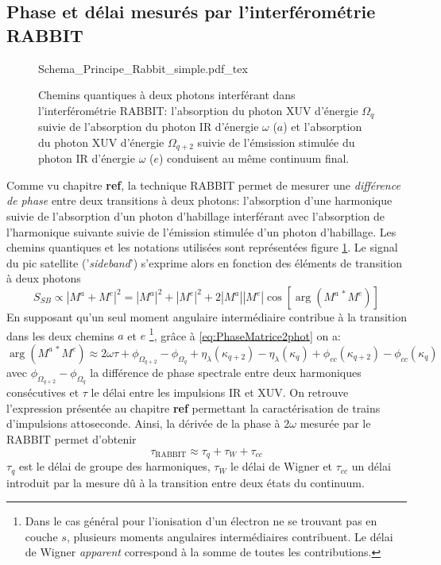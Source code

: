 \subsection{Phase et délai mesurés par l'interférométrie RABBIT}
\begin{figure}
\centering
\def\svgwidth{0.5\columnwidth}
{Schema_Principe_Rabbit_simple.pdf_tex}
\caption{Chemins quantiques à deux photons interférant dans l'interférométrie RABBIT: l'absorption du photon XUV d'énergie $\Omega_q$ suivie de l'absorption du photon IR d'énergie $\omega$ ($a$) et l'absorption du photon XUV d'énergie $\Omega_{q+2}$ suivie de l'émsission stimulée du photon IR d'énergie $\omega$ ($e$) conduisent au même continuum final.}
\label{fig:PrincipeRabbitSimple}
\end{figure}
Comme vu chapitre \textbf{ref}, la technique RABBIT permet de mesurer une \textit{différence de phase} entre deux transitions à deux photons: l'absorption d'une harmonique suivie de l'absorption d'un photon d'habillage interférant avec l'absorption de l'harmonique suivante suivie de l'émission stimulée d'un photon d'habillage. Les chemins quantiques et les notations utilisées sont représentées figure \ref{fig:PrincipeRabbitSimple}. Le signal du pic satellite ('\textit{sideband}') s'exprime alors en fonction des éléments de transition à deux photons
\begin{equation}
S_{SB} \propto |M^{a}+M^{e}|^2 = |M^{a}|^2 + |M^{e}|^2 + 2 |M^{a}||M^{e}| \cos[\arg (M^{a \: *} M^{e})]
\end{equation}
En supposant qu'un seul moment angulaire intermédiaire contribue à la transition dans les deux chemins $a$ et $e$ \footnote{Dans le cas général pour l'ionisation d'un électron ne se trouvant pas en couche $s$, plusieurs moments angulaires intermédiaires contribuent. Le délai de Wigner \textit{apparent} correspond à la somme de toutes les contributions.}, grâce à \ref{eq:PhaseMatrice2phot} on a:
\begin{equation}
\arg (M^{a \: *} M^{e}) \approx 2 \omega \tau + \phi_{\Omega_{q+2}} - \phi_{\Omega_{q}} + \eta_{\lambda}(\kappa_{q+2}) - \eta_{\lambda}(\kappa_{q}) + \phi_{cc}(\kappa_{q+2}) - \phi_{cc}(\kappa_q)
\end{equation} 
avec $\phi_{\Omega_{q+2}} - \phi_{\Omega_{q}}$ la différence de phase spectrale entre deux harmoniques consécutives et $\tau$ le délai entre les impulsions IR et XUV. On retrouve l'expression présentée au chapitre \textbf{ref} permettant la caractérisation de trains d'impulsions attoseconde. Ainsi, la dérivée de la phase à $2 \omega$ mesurée par le RABBIT permet d'obtenir
\begin{equation}
\tau_{\mathrm{RABBIT}} \approx \tau_q + \tau_W + \tau_{cc}
\label{eq:DelaiRabbitTotal}
\end{equation}
$\tau_q$ est le délai de groupe des harmoniques, $\tau_W$ le délai de Wigner et $\tau_{cc}$ un délai introduit par la mesure dû à la transition entre deux états du continuum.

